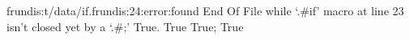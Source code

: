 frundis:t/data/if.frundis:24:error:found End Of File while `.#if' macro at line 23 isn't closed yet by a `.#;'
True.
True
True;
True

